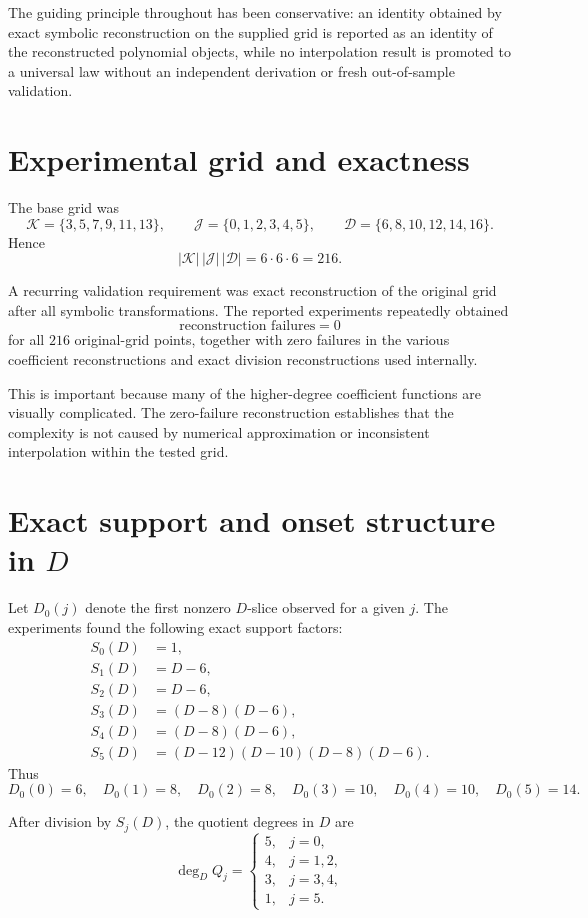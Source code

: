 \documentclass[11pt,a4paper]{article}
\begin{document}
The guiding principle throughout has been conservative: an identity obtained by exact symbolic reconstruction on the supplied grid is reported as an identity of the reconstructed polynomial objects, while no interpolation result is promoted to a universal law without an independent derivation or fresh out-of-sample validation.

\section{Experimental grid and exactness}

The base grid was
\[
\mathcal K=\{3,5,7,9,11,13\},
\qquad
\mathcal J=\{0,1,2,3,4,5\},
\qquad
\mathcal D=\{6,8,10,12,14,16\}.
\]
Hence
\[
|\mathcal K|\,|\mathcal J|\,|\mathcal D|=6\cdot6\cdot6=216.
\]

A recurring validation requirement was exact reconstruction of the original grid after all symbolic transformations. The reported experiments repeatedly obtained
\[
\boxed{\text{reconstruction failures}=0}
\]
for all $216$ original-grid points, together with zero failures in the various coefficient reconstructions and exact division reconstructions used internally.

This is important because many of the higher-degree coefficient functions are visually complicated. The zero-failure reconstruction establishes that the complexity is not caused by numerical approximation or inconsistent interpolation within the tested grid.

\section{Exact support and onset structure in $D$}

Let $D_0(j)$ denote the first nonzero $D$-slice observed for a given $j$. The experiments found the following exact support factors:
\begin{align}
S_0(D)&=1,\\
S_1(D)&=D-6,\\
S_2(D)&=D-6,\\
S_3(D)&=(D-8)(D-6),\\
S_4(D)&=(D-8)(D-6),\\
S_5(D)&=(D-12)(D-10)(D-8)(D-6).
\end{align}
Thus
\[
D_0(0)=6,\quad
D_0(1)=8,\quad
D_0(2)=8,\quad
D_0(3)=10,\quad
D_0(4)=10,\quad
D_0(5)=14.
\]

After division by $S_j(D)$, the quotient degrees in $D$ are
\[
\deg_D Q_j=
\begin{cases}
5,&j=0,\\
4,&j=1,2,\\
3,&j=3,4,\\
1,&j=5.
\end{cases}
\]
\end{document}
